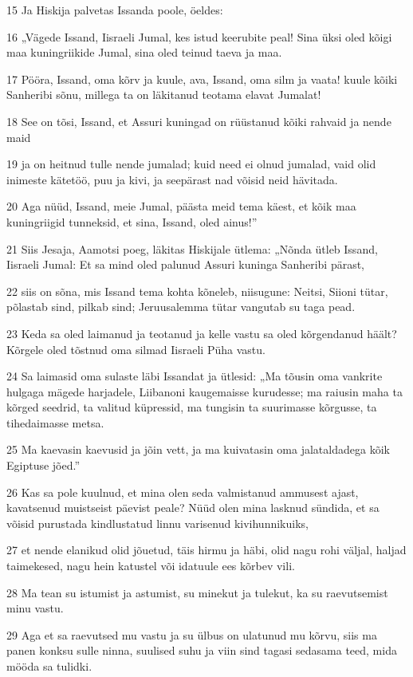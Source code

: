 \par 15 Ja Hiskija palvetas Issanda poole, öeldes:
\par 16 „Vägede Issand, Iisraeli Jumal, kes istud keerubite peal! Sina üksi oled kõigi maa kuningriikide Jumal, sina oled teinud taeva ja maa.
\par 17 Pööra, Issand, oma kõrv ja kuule, ava, Issand, oma silm ja vaata! kuule kõiki Sanheribi sõnu, millega ta on läkitanud teotama elavat Jumalat!
\par 18 See on tõsi, Issand, et Assuri kuningad on rüüstanud kõiki rahvaid ja nende maid
\par 19 ja on heitnud tulle nende jumalad; kuid need ei olnud jumalad, vaid olid inimeste kätetöö, puu ja kivi, ja seepärast nad võisid neid hävitada.
\par 20 Aga nüüd, Issand, meie Jumal, päästa meid tema käest, et kõik maa kuningriigid tunneksid, et sina, Issand, oled ainus!”
\par 21 Siis Jesaja, Aamotsi poeg, läkitas Hiskijale ütlema: „Nõnda ütleb Issand, Iisraeli Jumal: Et sa mind oled palunud Assuri kuninga Sanheribi pärast,
\par 22 siis on sõna, mis Issand tema kohta kõneleb, niisugune: Neitsi, Siioni tütar, põlastab sind, pilkab sind; Jeruusalemma tütar vangutab su taga pead.
\par 23 Keda sa oled laimanud ja teotanud ja kelle vastu sa oled kõrgendanud häält? Kõrgele oled tõstnud oma silmad Iisraeli Püha vastu.
\par 24 Sa laimasid oma sulaste läbi Issandat ja ütlesid: „Ma tõusin oma vankrite hulgaga mägede harjadele, Liibanoni kaugemaisse kurudesse; ma raiusin maha ta kõrged seedrid, ta valitud küpressid, ma tungisin ta suurimasse kõrgusse, ta tihedaimasse metsa.
\par 25 Ma kaevasin kaevusid ja jõin vett, ja ma kuivatasin oma jalataldadega kõik Egiptuse jõed.”
\par 26 Kas sa pole kuulnud, et mina olen seda valmistanud ammusest ajast, kavatsenud muistseist päevist peale? Nüüd olen mina lasknud sündida, et sa võisid purustada kindlustatud linnu varisenud kivihunnikuiks,
\par 27 et nende elanikud olid jõuetud, täis hirmu ja häbi, olid nagu rohi väljal, haljad taimekesed, nagu hein katustel või idatuule ees kõrbev vili.
\par 28 Ma tean su istumist ja astumist, su minekut ja tulekut, ka su raevutsemist minu vastu.
\par 29 Aga et sa raevutsed mu vastu ja su ülbus on ulatunud mu kõrvu, siis ma panen konksu sulle ninna, suulised suhu ja viin sind tagasi sedasama teed, mida mööda sa tulidki.
